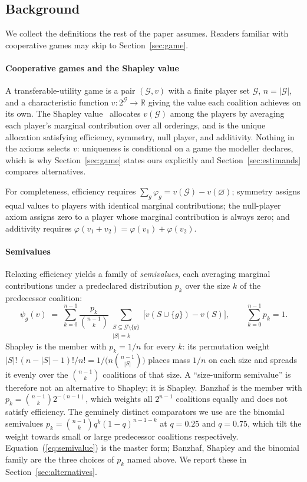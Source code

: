 \documentclass[pdflatex,sn-basic,Numbered]{sn-jnl}
\theoremstyle{plain}
\theoremstyle{definition}
\newcommand{\G}{\mathcal{G}}
\begin{document}
\subsection{Background}\label{sec:background}

We collect the definitions the rest of the paper assumes. Readers familiar with
cooperative games may skip to Section~\ref{sec:game}.

\paragraph{Cooperative games and the Shapley value}
A transferable-utility game is a pair $(\G, v)$ with a finite player set $\G$,
$n = |\G|$, and a characteristic function $v : 2^{\G} \to \mathbb{R}$ giving the
value each coalition achieves on its own. The Shapley
value~\citep{shapley1953} allocates $v(\G)$ among the players by averaging each
player's marginal contribution over all orderings, and is the unique allocation
satisfying efficiency, symmetry, null player, and additivity. Nothing in the
axioms selects $v$: uniqueness is conditional on a game the modeller declares,
which is why Section~\ref{sec:game} states ours explicitly and
Section~\ref{sec:estimands} compares alternatives.

For completeness, efficiency requires
$\sum_g\varphi_g=v(\G)-v(\varnothing)$; symmetry assigns equal values to
players with identical marginal contributions; the null-player axiom assigns
zero to a player whose marginal contribution is always zero; and additivity
requires $\varphi(v_1+v_2)=\varphi(v_1)+\varphi(v_2)$.

\paragraph{Semivalues}
Relaxing efficiency yields a family of \emph{semivalues}, each averaging
marginal contributions under a predeclared distribution $p_k$ over the size $k$
of the predecessor coalition:
%
\begin{equation}
\psi_g(v) \;=\; \sum_{k=0}^{n-1} \frac{p_k}{\binom{n-1}{k}}
\sum_{\substack{S \subseteq \G \setminus \{g\} \\ |S| = k}}
\bigl[v(S \cup \{g\}) - v(S)\bigr],
\qquad \sum_{k=0}^{n-1} p_k = 1 .
\label{eq:semivalue}
\end{equation}
Shapley is the member with
$p_k = 1/n$ for every $k$: its permutation weight
$|S|!\,(n-|S|-1)!/n! = 1/\bigl(n\binom{n-1}{|S|}\bigr)$ places mass $1/n$ on
each size and spreads it evenly over the $\binom{n-1}{k}$ coalitions of that
size. A ``size-uniform semivalue'' is therefore not an alternative to Shapley;
it is Shapley. Banzhaf is the member with
$p_k = \binom{n-1}{k}2^{-(n-1)}$, which weights all $2^{n-1}$ coalitions
equally and does not satisfy efficiency. The genuinely distinct comparators we
use are the binomial semivalues $p_k = \binom{n-1}{k}q^k(1-q)^{n-1-k}$ at
$q = 0.25$ and $q = 0.75$, which tilt the weight towards small or large
predecessor coalitions respectively. Equation~(\ref{eq:semivalue}) is the master form; Banzhaf, Shapley and the
binomial family are the three choices of $p_k$ named above. We report these in
Section~\ref{sec:alternatives}.
\end{document}
